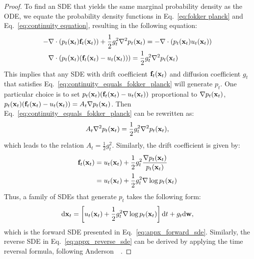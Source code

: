 \begin{proof}
To find an SDE that yields the same marginal probability density as the ODE, we equate the probability density functions in Eq.~\ref{eq:fokker planck} and Eq.~\ref{eq:continuity equation}, resulting in the following equation:
\begin{align}
    \nonumber -&\nabla\cdot (p_t(\mathbf{x}_t)\mathbf{f}_t(\mathbf{x}_t))+\frac{1}{2}g_t^2\nabla^2p_t(\mathbf{x}_t)=-\nabla\cdot(p_t(\mathbf{x}_t)u_t(\mathbf{x}_t))\\
    \label{eq:continuity_equals_fokker_planck}
    &\nabla\cdot (p_t(\mathbf{x}_t)(\mathbf{f}_t(\mathbf{x}_t)-u_t(\mathbf{x}_t)))=\frac{1}{2}g_t^2\nabla^2p_t(\mathbf{x}_t)
\end{align}
This implies that any SDE with drift coefficient $\mathbf{f}_t(\mathbf{x}_t)$ and diffusion coefficient $g_t$ that satisfies Eq.~\ref{eq:continuity_equals_fokker_planck} will generate $p_t$.
One particular choice is to set $p_t(\mathbf{x}_t)(\mathbf{f}_t(\mathbf{x}_t)-u_t(\mathbf{x}_t))$ proportional to $\nabla p_t(\mathbf{x}_t)$, \ie $p_t(\mathbf{x}_t)(\mathbf{f}_t(\mathbf{x}_t)-u_t(\mathbf{x}_t))=A_t \nabla p_t(\mathbf{x}_t)$. 
Then Eq.~\ref{eq:continuity_equals_fokker_planck} can be rewritten as:
\begin{align}
    \nonumber
    A_t \nabla^2 p_t(\mathbf{x}_t)=\frac{1}{2}g_t^2\nabla^2p_t(\mathbf{x}_t),
\end{align}
which leads to the relation $A_t=\frac{1}{2}g_t^2$. 
Similarly, the drift coefficient is given by:
\begin{align}
    \nonumber
    \mathbf{f}_t(\mathbf{x}_t)&=u_t(\mathbf{x}_t)+\frac{1}{2}g_t^2\frac{\nabla p_t(\mathbf{x}_t)}{p_t(\mathbf{x}_t)} \\
    \nonumber
    &=u_t(\mathbf{x}_t)+\frac{1}{2}g^2_t \nabla\log p_t(\mathbf{x}_t)
\end{align}
Thus, a family of SDEs that generate $p_t$ takes the following form:
\begin{align}
    \nonumber
    \mathrm{d} \mathbf{x}_t = \left[u_t(\mathbf{x}_t) + \frac{1}{2}g^2_t\nabla\log p_t(\mathbf{x}_t) \right] \mathrm{d}t + g_t \mathrm{d} \mathbf{w},
\end{align}
which is the forward SDE presented in Eq.~\ref{eq:appx_forward_sde}. 
Similarly, the reverse SDE in Eq.~\ref{eq:appx_reverse_sde} can be derived by applying the time reversal formula, following Anderson~\etal~\cite{Anderson:1982SDE}. 
\end{proof}

